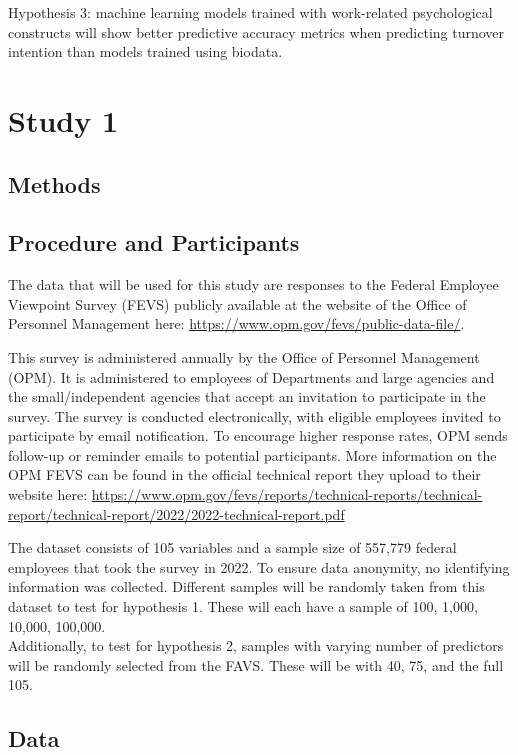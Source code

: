 \documentclass[
  man]{apa7}
\begin{document}
Hypothesis 3: machine learning models trained with work-related psychological constructs will show better predictive accuracy metrics when predicting turnover intention than models trained using biodata.

\section{Study 1}\label{study-1}

\subsection{Methods}\label{methods}

\subsection{Procedure and Participants}\label{procedure-and-participants}

The data that will be used for this study are responses to the Federal Employee Viewpoint Survey (FEVS) publicly available at the website of the Office of Personnel Management here: \url{https://www.opm.gov/fevs/public-data-file/}.

This survey is administered annually by the Office of Personnel Management (OPM). It is administered to employees of Departments and large agencies and the small/independent agencies that accept an invitation to participate in the survey. The survey is conducted electronically, with eligible employees invited to participate by email notification. To encourage higher response rates, OPM sends follow-up or reminder emails to potential participants. More information on the OPM FEVS can be found in the official technical report they upload to their website here: \url{https://www.opm.gov/fevs/reports/technical-reports/technical-report/technical-report/2022/2022-technical-report.pdf}

The dataset consists of 105 variables and a sample size of 557,779 federal employees that took the survey in 2022. To ensure data anonymity, no identifying information was collected. Different samples will be randomly taken from this dataset to test for hypothesis 1. These will each have a sample of 100, 1,000, 10,000, 100,000.\\
Additionally, to test for hypothesis 2, samples with varying number of predictors will be randomly selected from the FAVS. These will be with 40, 75, and the full 105.

\subsection{Data}\label{data}
\end{document}
